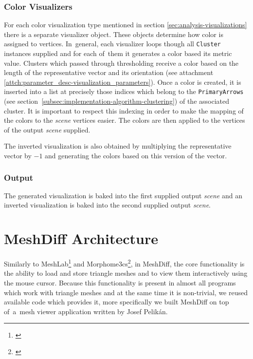 \subsubsection{Color Visualizers}

For each color visualization type mentioned in section \ref{sec:analysis-visualizations} there is a separate visualizer object. These objects determine how color is assigned to vertices. In~general, each visualizer loops though all \verb+Cluster+ instances supplied and for each of~them it generates a color based its metric value. Clusters which passed through thresholding receive a color based on the length of the representative vector and its orientation (see attachment \ref{attch:parameter_desc-visualization_parameters}). Once a color is created, it is inserted into a list at precisely those indices which belong to the \verb+PrimaryArrows+ (see section~\ref{subsec:implementation-algorithm-clustering}) of the associated cluster. It is important to respect this indexing in order to make the mapping of the colors to the {\it scene} vertices easier. The colors are then applied to the vertices of the output {\it scene} supplied\footnotemark.

The inverted visualization is also obtained by multiplying the representative vector by \(-1\) and generating the colors based on this version of the vector.


\subsubsection{Output}

The generated visualization is baked into the first supplied output {\it scene} and an inverted visualization is baked into the second supplied output {\it scene}.
\section{MeshDiff Architecture}
\label{sec:implementation-architecture}

Similarly to MeshLab\footnote{\citet{MeshLab}} and Morphome3cs\footnote{\citet{Morpho}}, in MeshDiff, the core functionality is the ability to load and store triangle meshes and to view them interactively using the mouse cursor. Because this functionality is present in almost all programs which work with triangle meshes and at the same time it is non-trivial, we reused available code which provides it, more specifically we built MeshDiff on top of~a~mesh viewer application written by Josef Pelikán.

